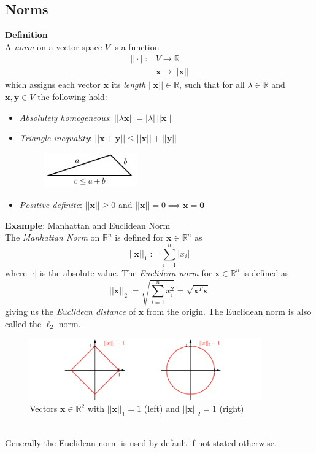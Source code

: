 \documentclass{report}
\begin{document}
\subsection{Norms} %
\label{analytic geometry:norms}
\textbf{Definition}\\
A \textit{norm} on a vector space $V$ is a function
\begin{align*}
||\cdot||:&V\to \mathbb{R}\\
&\bm{x}\mapsto||\bm{x}||
\end{align*}
which assigns each vector $\bm{x}$ its \textit{length} $||\bm{x}||\in\mathbb{R}$, such that for all 
$\lambda\in\mathbb{R}$ and $\bm{x},\bm{y}\in V$ the following hold:
\begin{itemize}
\item\textit{Absolutely homogeneous}: $||\lambda \bm{x}||=|\lambda|\,||\bm{x}||$
\item\textit{Triangle inequality}: $||\bm{x}+\bm{y}||\leq||\bm{x}||+||\bm{y}||$\begin{figure}[h]
\includegraphics[width=4cm]{5}\\
\centering
\end{figure}
\item\textit{Positive definite}: $||\bm{x}||\geq0$ and $||\bm{x}||=0\implies\bm{x}=\mathbf{0}$
\end{itemize}
\textbf{Example}: Manhattan and Euclidean Norm\\
The \textit{Manhattan Norm} on $\mathbb{R}^n$ is defined for $\bm{x}\in\mathbb{R}^n$ as 
\begin{equation*}
||\bm{x}||_1:=\sum^{n}_{i=1}|x_i|
\end{equation*}
where $|\cdot|$ is the absolute value.
The \textit{Euclidean norm} for $\bm{x}\in\mathbb{R}^n$ is defined as
\begin{equation*}
||\bm{x}||_2:=\sqrt{\sum^n_{i=1}x_i^2}=\sqrt{\bm{x}^T\bm{x}}
\end{equation*}
giving us the \textit{Euclidean distance} of $\bm{x}$ from the origin. The Euclidean norm is also 
called the $\ell_2$ norm.
\begin{figure}[h]
\includegraphics[width=10cm]{6}\\
\centering
Vectors $\bm{x}\in\mathbb{R}^2$ with $||\bm{x}||_1=1$ (left) and $||\bm{x}||_2=1$ (right)
\end{figure}\\
Generally the Euclidean norm is used by default if not stated otherwise.
\newpage
\end{document}
